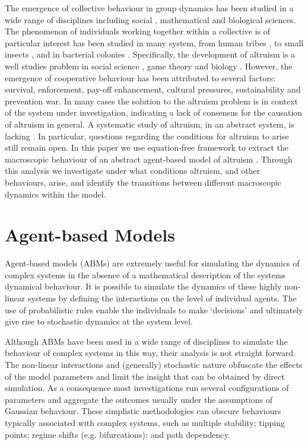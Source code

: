 \documentclass[11pt]{article}
\begin{document}
The emergence of collective behaviour in group dynamics has been studied in a wide range of disciplines including social \cite{Nowak1998}, mathematical \cite{Camerer2003} and biological \cite{Szathmary1999} sciences. The phenomenon of individuals working together within a collective is of particular interest has been studied in many system, from human tribes \cite{}, to small insects \cite{}, and in bacterial colonies \cite{}. Specifically, the development of altruism \cite{Boyd2003,Mohtashemi2003} is a well studies problem in social science \cite{Nowak1998,Janssen2014,Pepper2007}, game theory \cite{Camerer2003} and biology \cite{Szathmary1999}. However, the emergence of cooperative behaviour has been attributed to several factors: survival, enforcement, pay-off enhancement, cultural pressures, sustainability and prevention war. In many cases the solution to the altruism problem is in context of the system under investigation, indicating a lack of consensus for the causation of altruism in general. A systematic study of altruism, in an abstract system, is lacking \cite{Thomas2016ember}. In particular, questions regarding the conditions for altruism to arise still remain open. In this paper we use equation-free framework \cite{Theodoropoulos2000} to extract the macroscopic behaviour of an abstract agent-based model of altruism \cite{Mittleldorf2000}. Through this analysis we investigate under what conditions altruism, and other behaviours, arise, and identify the transitions between different macroscopic dynamics within the model. 


 

\section{Agent-based Models}
\label{sec:abm}

Agent-based models (ABMs) are extremely useful for simulating the dynamics of complex systems in the absence of a mathematical description of the systems dynamical behaviour. It is possible to simulate the dynamics of these highly non-linear systems by defining the interactions on the level of individual agents. The use of probabilistic rules enable the individuals to make `decisions' and ultimately give rise to stochastic dynamics at the system level. 

Although ABMs have been used in a wide range of disciplines to simulate the behaviour of complex systems in this way, their analysis is not straight forward. The non-linear interactions and (generally) stochastic nature obfuscate the effects of the model parameters and limit the insight that can be obtained by direct simulation. As a consequence most investigations run several configurations of parameters and aggregate the outcomes usually under the assumptions of Gaussian behaviour. These simplistic methodologies can obscure behaviours typically associated with complex systems, such as multiple stability; tipping points; regime shifts (e.g. bifurcations); and path dependency. 
\end{document}

